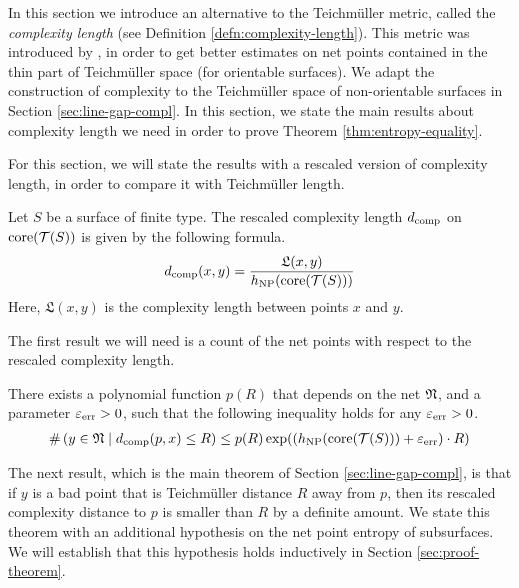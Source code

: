 In this section we introduce an alternative to the Teichmüller metric, called the \emph{complexity length} (see Definition \ref{defn:complexity-length}).
This metric was introduced by \textcite{dowdall2023lattice}, in order to get better estimates on net points contained in the thin part of Teichmüller space (for orientable surfaces).
We adapt the construction of complexity to the Teichmüller space of non-orientable surfaces in Section \ref{sec:line-gap-compl}.
In this section, we state the main results about complexity length we need in order to prove Theorem \ref{thm:entropy-equality}.

For this section, we will state the results with a rescaled version of complexity length, in order to compare it with Teichmüller length.

\begin{definition}
  Let $S$ be a surface of finite type.
  The rescaled complexity length $d_{\mathrm{comp}}$ on $\mathrm{core}(\mathcal{T}(S))$ is given by the following formula.
  \begin{align*}
    d_{\mathrm{comp}}(x, y) = \frac{\mathfrak{L}(x,y)}{h_{\mathrm{NP}}(\mathrm{core}(\mathcal{T}(S)))}
  \end{align*}
  Here, $\mathfrak{L}(x,y)$ is the complexity length between points $x$ and $y$.
\end{definition}

The first result we will need is a count of the net points with respect to the rescaled complexity length.

\begin{theorem}
  \label{thm:counting-with-complexity-rescaled}
  There exists a polynomial function $p(R)$ that depends on the net $\mathfrak{N}$, and a parameter $\varepsilon_{\mathrm{err}} > 0$, such that the following inequality holds for any $\varepsilon_{\mathrm{err}} > 0$.
  \begin{align*}
    \#\left( y \in \mathfrak{N} \mid d_{\mathrm{comp}}(p, x) \leq R \right) \leq p(R) \exp((h_{\mathrm{NP}}(\mathrm{core}(\mathcal{T}(S))) + \varepsilon_{\mathrm{err}}) \cdot R)
  \end{align*}
\end{theorem}

The next result, which is the main theorem of Section \ref{sec:line-gap-compl}, is that if $y$ is a bad point that is Teichmüller distance $R$ away from $p$, then its rescaled complexity distance to $p$ is smaller than $R$ by a definite amount.
We state this theorem with an additional hypothesis on the net point entropy of subsurfaces.
We will establish that this hypothesis holds inductively in Section \ref{sec:proof-theorem}.

